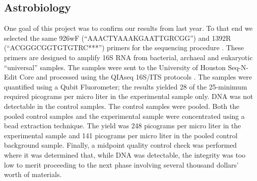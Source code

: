 \subsection{Astrobiology}
\label{sec:Astrobiology-Results}

One goal of this project was to confirm our results from last year. To that end we selected the same 926wF (“AAACTYAAAKGAATTGRCGG”) and 1392R (“ACGGGCGGTGTGTRC***”) primers for the sequencing procedure \cite{SORA}. These primers are designed to amplify 16S RNA from bacterial, archaeal and eukaryotic “universal” samples. The samples were sent to the University of Houston Seq-N-Edit Core \cite{Seq-N-Edit Core} and processed using the QIAseq 16S/ITS protocols \cite{QIAseq}. The samples were quantified using a Qubit Fluorometer; the results yielded 28 of the 25-minimum required picograms per micro liter in the experimental sample only. DNA was not detectable in the control samples. The control samples were pooled. Both the pooled control samples and the experimental sample were concentrated using a bead extraction technique. The yield was 248 picograms per micro liter in the experimental sample and 141 picograms per micro liter in the pooled control background sample. Finally, a midpoint quality control check was  performed where it was determined that, while DNA was detectable, the integrity was too low to merit proceeding to the next phase involving several thousand dollars’ worth of materials. 